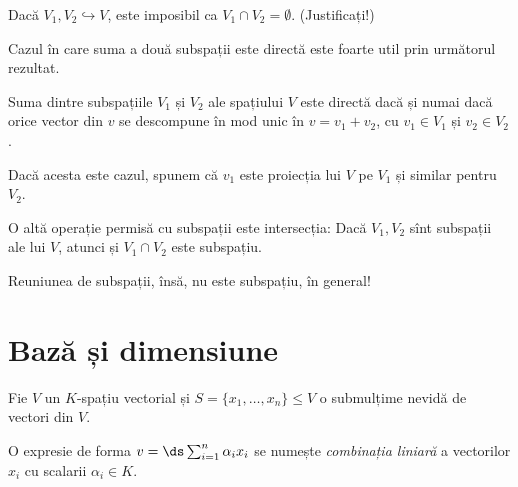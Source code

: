 \begin{remark}\label{rk:inters-subsp}
    Dacă $ V_1, V_2 \hookrightarrow V $, este imposibil ca $ V_1 \cap V_2 = \emptyset $. (Justificați!)
\end{remark}

Cazul în care suma a două subspații este directă este foarte util prin următorul rezultat.

\begin{proposition}\label{prop:suma-dir}
    Suma dintre subspațiile $ V_1 $ și $ V_2 $ ale spațiului $ V $ este directă dacă și 
    numai dacă orice vector din $ v $ se descompune în mod unic în $ v = v_1 + v_2 $,
    cu $ v_1 \in V_1 $ și $ v_2 \in V_2 $.

    Dacă acesta este cazul, spunem că $ v_1 $ este proiecția lui $ V $ pe $ V_1 $ și
    similar pentru $ V_2 $.
\end{proposition}

O altă operație permisă cu subspații este intersecția: Dacă $ V_1, V_2 $ sînt subspații
ale lui $ V $, atunci și $ V_1 \cap V_2 $ este subspațiu.

Reuniunea de subspații, însă, nu este subspațiu, în general!

\section{Bază și dimensiune}

Fie $ V $ un $ K $-spațiu vectorial și $ S = \{ x_1, \dots, x_n \} \leq V $ o submulțime
nevidă de vectori din $ V $.

O expresie de forma $ v = \ds\sum_{i = 1}^n \alpha_i x_i $ se numește \emph{combinația %
liniară} a vectorilor $ x_i $ cu scalarii $ \alpha_i \in K $.

